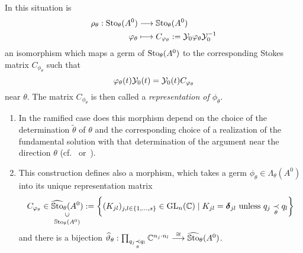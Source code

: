 \begin{prop}\label{prop:representation}
  In this situation is
  \begin{align*}
    \rho_{\theta}:\operatorname{Sto}_\theta(A^0)&\longrightarrow\operatorname{\mathbb{S}to}_\theta(A^0)
    \\\varphi_\theta
    &\longmapsto
    C_{\varphi_\theta}:=\mathcal{Y}_{0}\varphi_\theta\mathcal{Y}_{0}^{-1}
  \end{align*}
  an isomorphism which maps a germ of $\operatorname{Sto}_\theta(A^0)$ to the corresponding
  Stokes matrix $C_{\phi_\theta}$ such that
  \begin{equation}\label{eq:representation}
    \varphi_\theta(t)\mathcal{Y}_{0}(t)=\mathcal{Y}_{0}(t)C_{\varphi_\theta}
  \end{equation}
  near $\theta$.
  The matrix $C_{\phi_\theta}$ is then called a \emph{representation of
  $\phi_\theta$}.
  \begin{s-rem}\label{rem:representation}
    \begin{enumerate}
      \item In the ramified case does this morphism depend on the choice of the
        determination $\tilde\theta$ of $\theta$ and the corresponding choice of
        a realization of the fundamental solution with that determination of the
        argument near the direction $\theta$
        (cf.~\cite{Loday1994} or~\cite[78f]{Loday2014}).
      \item {}
        This construction defines also a morphism, which takes a germ
        $\phi_\theta\in\Lambda_\theta(A^0)$ into its
        unique representation matrix
        \[
          C_{\phi_\theta} \in
          \underset{\SSto_\theta(A^0)}{%
            \underset{\text{\rotatebox[origin=c]{90}{$\subset$}}}{%
              \hat\SSto_{\theta}(A^0)}}
          :=
          \left\{(K_{jl})_{j,l\in\{1,\dots,s\}}
            \in \GL_n(\C)\mid K_{jl}=\bdelta_{jl} \text{ unless }
            q_j \underset{\theta}{\prec} q_l \right\}
        \]
        and there is a bijection $\widehat\vartheta_\theta:
        \prod_{q_j\underset{\theta}{\prec}q_l}\mathbb{C}^{n_j \cdot n_l}
        \overset{\cong}{\longrightarrow} \widehat{\operatorname{\mathbb{S}to}}_\theta(A^0)$.
        \begin{comment}
          Does this define a local-constant sheaf
          \[
            I\mapsto \hat\SSto_{I}(A^0)
            :=
            \left\{(K_{jl})_{j,l\in\{1,\dots,s\}}
              \in \GL_n(\C)\mid K_{jl}=\bdelta_{jl} \text{ unless }
              q_j \underset{\theta}{\prec} q_l
              \text{ for some } \theta\in I\right\}
          \]
          and a skyscraper sheaf
          \[
            I\mapsto \SSto_{I}(A^0) \,.
          \]
          \PROBLEM
        \end{comment}
    \end{enumerate}
  \end{s-rem}
\end{prop}
